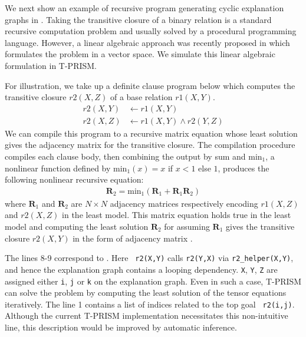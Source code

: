 \documentclass[a4paper]{report}
\newcommand{\mmat}[1]{\mathbf{#1}}
\newcommand{\minx}{\mbox{min}_1}
\begin{document}
We  next  show  an  example of  recursive  program  generating  cyclic
explanation  graphs  in  .   Taking  the  transitive
closure  of a  binary  relation is  a  standard recursive  computation
problem  and  usually solved  by  a  procedural programming  language.
However,   a   linear   algebraic  approach   was   recently   proposed
in  \cite{sato2017linear} which  formulates  the problem  in a  vector
space.  We simulate this linear algebraic formulation in T-PRISM.

For illustration,  we take  up a definite  clause program  below which
computes  the   transitive  closure  $r2(X,Z)$  of   a  base  relation
$r1(X,Y)$.
%
\begin{align}\nonumber
r2(X,Y) & \leftarrow r1(X,Y) \\
r2(X,Z) & \leftarrow r1(X,Y) \wedge r2(Y,Z)
\label{eq:trnsitive}
\end{align}
%
We can compile this program to a recursive matrix equation whose least
solution gives the  adjacency matrix for the  transitive closure.  The
compilation procedure  compiles each  clause body, then  combining the
output by sum and $\minx$, a nonlinear function defined by $\minx(x) =
x$ if  $x < 1$  else $1$,  produces the following  nonlinear recursive
equation:
%
\begin{eqnarray}
\mmat{R}_2 = \minx(\mmat{R}_1+\mmat{R}_1\mmat{R}_2)
\label{eq:tr}
\end{eqnarray}
%
where  $\mmat{R}_1$  and  $\mmat{R}_2$  are  $N  \times  N$  adjacency
matrices respectively  encoding $r1(X,Z)$  and $r2(X,Z)$ in  the least
model.   This  matrix equation  holds  true  in  the least  model  and
computing  the  least   solution  $\mmat{R}_2$  for  
assuming $\mmat{R}_1$  gives the  transitive closure $r2(X,Y)$  in the
form of adjacency matrix \cite{sato2017linear}.

The  lines  8-9  correspond to  .   Here  {\tt
	r2(X,Y)} calls {\tt r2(Y,X)} via  {\tt r2\_helper(X,Y)}, and hence the
explanation graph  contains a looping  dependency.  {\tt X},  {\tt Y},
{\tt  Z} are  assigned either  {\tt  i}, {\tt  j}  or {\tt  k} on  the
explanation graph.  Even in such a case, T-PRISM can solve the problem
by computing the  least solution of the  tensor equations iteratively.
The line  1 contains a  list of indices related  to the top  goal {\tt
	r2(i,j)}.   Although the  current  T-PRISM implementation  necessitates
this  non-intuitive  line,  this  description  would  be  improved  by
automatic inference.
\end{document}
